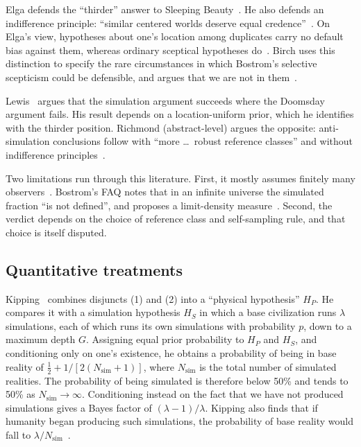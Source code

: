 Elga defends the ``thirder'' answer to Sleeping Beauty~\cite{Elga2000self}. He also
defends an indifference principle: ``similar centered worlds deserve equal
credence''~\cite{Elga2004defeating}. On Elga's view, hypotheses about one's location among
duplicates carry no default bias against them, whereas ordinary sceptical hypotheses
do~\cite{Elga2004defeating}. Birch uses this distinction to specify the rare
circumstances in which Bostrom's selective scepticism could be defensible, and argues that
we are not in them~\cite{Birch2013on}.

Lewis~\cite{Lewis2013doomsday} argues that the simulation argument succeeds where the
Doomsday argument fails. His result depends on a location-uniform prior, which he
identifies with the thirder position. Richmond (abstract-level) argues the opposite:
anti-simulation conclusions follow with ``more \dots\ robust reference classes'' and
without indifference principles~\cite{Richmond2017why}.

Two limitations run through this literature. First, it mostly assumes finitely many
observers~\cite{Bostrom2011patch}. Bostrom's FAQ notes that in an infinite universe the
simulated fraction ``is not defined'', and proposes a limit-density
measure~\cite[Q7]{Bostrom2025simulation}. Second, the verdict depends on the choice of
reference class and self-sampling rule, and that choice is itself disputed.

\subsection{Quantitative treatments}
\label{sec:philosophy:bayes}

Kipping~\cite{Kipping2020bayesian} combines disjuncts (1) and (2) into a ``physical
hypothesis'' $H_P$. He compares it with a simulation hypothesis $H_S$ in which a base
civilization runs $\lambda$ simulations, each of which runs its own simulations with
probability $p$, down to a maximum depth $G$. Assigning equal prior probability to $H_P$
and $H_S$, and conditioning only on one's existence, he obtains a probability of being in
base reality of $\tfrac12 + 1/[2(N_{\mathrm{sim}}+1)]$, where $N_{\mathrm{sim}}$ is the
total number of simulated realities. The probability of being simulated is therefore below
50\% and tends to 50\% as $N_{\mathrm{sim}}\to\infty$. Conditioning instead on the fact
that we have not produced simulations gives a Bayes factor of $(\lambda-1)/\lambda$. Kipping
also finds that if humanity began producing such simulations, the probability of base
reality would fall to $\lambda/N_{\mathrm{sim}}$~\cite{Kipping2020bayesian}.

